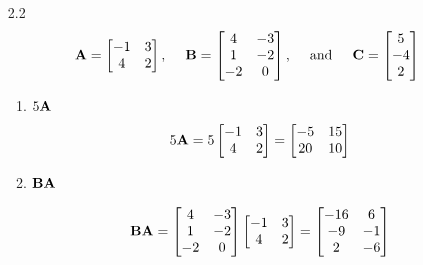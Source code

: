 \begin{enumerate}[font=\bfseries]
\begin{enumerate}
        \end{enumerate} 
        \item[2.2]
        \[
            \bold{A} = \begin{bmatrix}
                -1 & 3 \\
                4 & 2  
              \end{bmatrix}\text{,}\hspace{0.2in}
            \bold{B} = \begin{bmatrix}
                4  & -3 \\
                1  & -2 \\
                -2 &  0
            \end{bmatrix}\text{,}\hspace{0.2in}\text{and}\hspace{0.2in}
            \bold{C} = \begin{bmatrix}
                5 \\
                -4 \\
                2
            \end{bmatrix}
        \]
        \begin{enumerate}
            \item $5\bold{A}$
            \[ 5\bold{A} =
            5 \begin{bmatrix}
              -1 & 3 \\
              4 & 2  
            \end{bmatrix} = 
            \begin{bmatrix}
                -5 & 15 \\
                20 & 10  
              \end{bmatrix}
            \]

            \item $\bold{BA}$
            

            \[
                \bold{BA} =
                \begin{bmatrix}
                    4  & -3 \\
                    1  & -2 \\
                    -2 &  0
                \end{bmatrix}
                \begin{bmatrix}
                    -1 & 3 \\
                    4 & 2  
                  \end{bmatrix} =
                  \begin{bmatrix}
                    -16  & 6 \\
                    -9 & -1 \\
                    2 &  -6
                \end{bmatrix}
            \]


\end{enumerate}
\end{enumerate}
